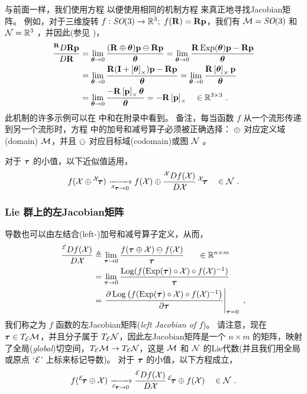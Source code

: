 与前面一样，我们使用方程  以便使用相同的机制方程  来真正地寻找Jacobian矩阵。
%
%
%
例如，对于三维旋转 $f:\textit{SO}(3)\to{\mathbb R}^3;~f({\bf R})={\bf R}{\bf p}$，我们有 $\mathcal{M}=\textit{SO}(3)$ 和 $\mathcal{N}={\mathbb R}^3$ ，并因此(参见 )， 
%
\begin{align*}
\rdpar{\bfR\bfp}{\bfR}
  &= \lim_{\bth\to0}\frac{(\bfR\op\bth)\bfp\om\bfR\bfp}{\bth} 
  = \lim_{\bth\to0}\frac{\bfR\Exp(\bth)\bfp-\bfR\bfp}{\bth} \\
  &= \lim_{\bth\to0}\frac{\bfR(\bfI+\hatx{\bth})\bfp-\bfR\bfp}{\bth} 
  = \lim_{\bth\to0}\frac{\bfR\hatx{\bth}\bfp}{\bth} \\
  &= \lim_{\bth\to0}\frac{-\bfR\hatx{\bfp}\bth}{\bth} 
  = -\bfR\hatx{\bfp} 
  ~~~\in \bbR^{3\times 3}
  ~.
\end{align*}
%
此机制的许多示例可以在  中和在附录中看到。
%
备注，每当函数 $f$ 从一个流形传递到另一个流形时，方程  中的加号和减号算子必须被正确选择：
$\oplus$ 对应定义域(domain) $\mathcal{M}$，并且 $\ominus$ 对应目标域(codomain)或图 $\mathcal{N}$ 。


对于 ${\bm \tau}$ 的小值，以下近似值适用，
%
\begin{align}\label{equ:lin_approx}
f(\cX\op{^\cX\!\bftau}) \xrightarrow[{^\cX\!\bftau}\to0]{} f(\cX)\op\rdpar{f(\cX)}{\cX}\,{^\cX\!\bftau}
\quad \in \cN
~.
\end{align}
%



\subsubsection{Lie 群上的左Jacobian矩阵}

导数也可以由左结合(left-)加号和减号算子定义，从而，
%
\begin{align}\label{equ:left-Jacobian}
\ldpar{f(\cX)}{\cX} 
& \te \lim_{\bftau\to0}\frac{f(\bftau\op\cX)\om f(\cX)}{\bftau}  
~~~~~\in\bbR^{n\times m}
\\
& = \lim_{\bftau\to0}\frac{\Log(f(\Exp(\bftau)\circ\cX) \circ f(\cX)\inv)}{\bftau} \notag
\\
&= \pjac{\Log\big(f(\Exp(\bftau)\circ\cX) \circ f(\cX)\inv\big)}{\bftau}{\bftau=0} \notag
~,
\end{align}
%
我们称之为 $f$ 函数的左Jacobian矩阵(\emph{left Jacobian of $f$})。
请注意，现在 ${\bm \tau}\in T_{\mathcal{E}}{\mathcal{M}}$，并且分子属于 $T_{\mathcal{E}}{\mathcal{N}}$，因此左Jacobian矩阵是一个 $n\times m$ 的矩阵，映射了全局(\emph{global})切空间，$T_{\mathcal{E}}{\mathcal{M}}\to T_{\mathcal{E}}{\mathcal{N}}$，这是 $\mathcal{M}$ 和 $\mathcal{N}$ 的Lie代数(并且我们用全局或原点 `$\mathcal{E}$' 上标来标记导数)。
对于 ${\bm \tau}$ 的小值，以下方程成立，
%
\begin{align}\label{equ:lin_approx_left}
f({^\cE\!\bftau}\op\cX) \xrightarrow[{^\cE\!\bftau}\to0]{} \ldpar{f(\cX)}{\cX}\,{^\cE\!\bftau} \op f(\cX)
\quad \in \cN
~.
\end{align}

